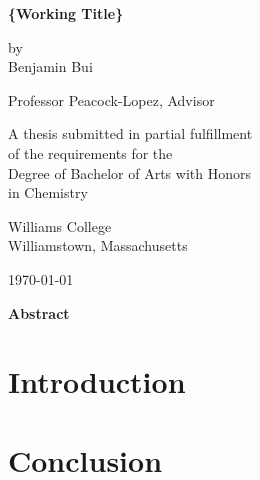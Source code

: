 \documentclass[12pt,twoside]{report}
\begin{document}
\begin{titlepage}
	\begin{center}
		\vspace*{1.5 cm}
		\textbf{\{Working Title\}}
		

		\vspace{1.5 cm}
		
		by\\ Benjamin Bui
		\vspace{1.5 cm}
		
		Professor Peacock-Lopez, Advisor
		\vspace{1.5 cm}
		
		A thesis submitted in partial fulfillment\\
		of the requirements for the\\
		Degree of Bachelor of Arts with Honors\\
		in Chemistry
		\vspace{1.5 cm}
		
		Williams College\\
		Williamstown, Massachusetts
		\vspace{1.5 cm}
		
		\today
	\end{center}
\end{titlepage}
\thispagestyle{plain}
\begin{center}
	\vspace*{\fill}
	\textbf{Abstract}\\
	\lipsum[1-2]
	\vspace*{\fill}
\end{center}

\chapter*{Introduction}

\chapter*{Conclusion}

\end{document}
